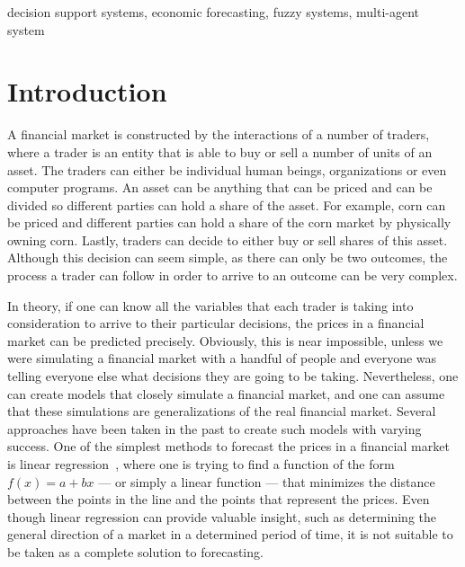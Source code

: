 \documentclass{ieeeaccess}
\begin{document}
\begin{keywords}
decision support systems, economic forecasting, fuzzy systems,
multi-agent system
\end{keywords}

\titlepgskip=-15pt

\maketitle

\section{Introduction}
\label{section:introduction}


A financial market is constructed by the interactions of a number of traders,
where a trader is an entity that is able to buy or sell a number of units of an
asset. The traders can either be individual human beings, organizations or even
computer programs. An asset can be anything that can be priced and can be
divided so different parties can hold a share of the asset. For example, corn
can be priced and different parties can hold a share of the corn market by
physically owning corn. Lastly, traders can decide to either buy or sell shares
of this asset. Although this decision can seem simple, as there can only be two
outcomes, the process a trader can follow in order to arrive to an outcome can
be very complex.

In theory, if one can know all the variables that each trader is taking into
consideration to arrive to their particular decisions, the prices in a financial
market can be predicted precisely. Obviously, this is near impossible, unless we
were simulating a financial market with a handful of people and everyone was
telling everyone else what decisions they are going to be taking. Nevertheless,
one can create models that closely simulate a financial market, and one can
assume that these simulations are generalizations of the real financial
market. Several approaches have been taken in the past to create such models
with varying success. One of the simplest methods to forecast the prices in a
financial market is linear %
regression~\cite{kutner2004applied}, where one is trying to find a function of
the form $f(x) = a + bx$ --- or simply a linear function --- that minimizes the
distance between the points in the line and the points that represent the
prices. Even though linear regression can provide valuable insight, such as
determining the general direction of a market in a determined period of time, it
is not suitable to be taken as a complete solution to forecasting.
\end{document}
